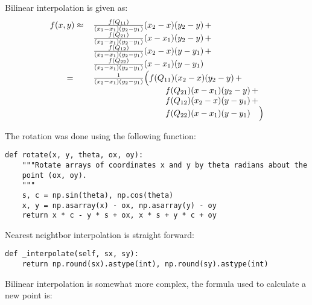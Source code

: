 Bilinear interpolation is given as:
\begin{gather*} 
\begin{array}{ l l}
f(x,y) \approx & \, \frac{f(Q_{11})}{(x_2-x_1)(y_2-y_1)} (x_2-x)(y_2-y) \, + \\
               & \, \frac{f(Q_{21})}{(x_2-x_1)(y_2-y_1)} (x-x_1)(y_2-y) \, + \\
               & \, \frac{f(Q_{12})}{(x_2-x_1)(y_2-y_1)} (x_2-x)(y-y_1) \, + \\
               & \, \frac{f(Q_{22})}{(x_2-x_1)(y_2-y_1)} (x-x_1)(y-y_1) \\
   \qquad          = & \, \frac{1}{(x_2-x_1)(y_2-y_1)} \Big(   f(Q_{11})(x_2-x)(y_2-y) \, + \\
               & \, \qquad \qquad \qquad \qquad \; \;    f(Q_{21})(x-x_1)(y_2-y) \, + \\
               & \, \qquad \qquad \qquad \qquad \; \;    f(Q_{12})(x_2-x)(y-y_1) \, + \\
               & \, \qquad \qquad \qquad \qquad \; \;    f(Q_{22})(x-x_1)(y-y_1) \quad \Big)
\end{array}
\end{gather*}

The rotation was done using the following function:
\begin{verbatim}
def rotate(x, y, theta, ox, oy):
    """Rotate arrays of coordinates x and y by theta radians about the
    point (ox, oy).
    """
    s, c = np.sin(theta), np.cos(theta)
    x, y = np.asarray(x) - ox, np.asarray(y) - oy
    return x * c - y * s + ox, x * s + y * c + oy
\end{verbatim}


Nearest neightbor interpolation is straight forward:

\begin{verbatim}
def _interpolate(self, sx, sy):
    return np.round(sx).astype(int), np.round(sy).astype(int)

\end{verbatim}

Bilinear interpolation is somewhat more complex, the formula used to calculate a new point is:

